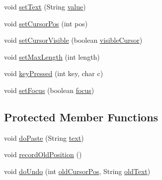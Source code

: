 \begin{DoxyCompactItemize}
\item 
void \mbox{\hyperlink{classorg_1_1newdawn_1_1slick_1_1gui_1_1_text_field_a5c926f3fc3503b4e197ebca868b101c0}{set\+Text}} (String \mbox{\hyperlink{classorg_1_1newdawn_1_1slick_1_1gui_1_1_text_field_a23c571aa0aa30ccbc28a090a06a444b7}{value}})
\item 
void \mbox{\hyperlink{classorg_1_1newdawn_1_1slick_1_1gui_1_1_text_field_a786d3eeca6b5574c561bab7492812010}{set\+Cursor\+Pos}} (int pos)
\item 
void \mbox{\hyperlink{classorg_1_1newdawn_1_1slick_1_1gui_1_1_text_field_a4eb4665c2c85367c2ab3fbe4c5be62b8}{set\+Cursor\+Visible}} (boolean \mbox{\hyperlink{classorg_1_1newdawn_1_1slick_1_1gui_1_1_text_field_af9a8a737887d06968db25185b999f5d0}{visible\+Cursor}})
\item 
void \mbox{\hyperlink{classorg_1_1newdawn_1_1slick_1_1gui_1_1_text_field_abd9e02715d6b12fbac7c79adc6fe70dc}{set\+Max\+Length}} (int length)
\item 
void \mbox{\hyperlink{classorg_1_1newdawn_1_1slick_1_1gui_1_1_text_field_abe8804392248db859a452f8bbf0955a1}{key\+Pressed}} (int key, char c)
\item 
void \mbox{\hyperlink{classorg_1_1newdawn_1_1slick_1_1gui_1_1_text_field_afc1eb9faa443f02ad96712a334989ad2}{set\+Focus}} (boolean \mbox{\hyperlink{classorg_1_1newdawn_1_1slick_1_1gui_1_1_abstract_component_a9a7b67f481728081895d167e792aaa74}{focus}})
\end{DoxyCompactItemize}
\subsection*{Protected Member Functions}
\begin{DoxyCompactItemize}
\item 
void \mbox{\hyperlink{classorg_1_1newdawn_1_1slick_1_1gui_1_1_text_field_a372f3a93f21b6b105617951d35307aa9}{do\+Paste}} (String \mbox{\hyperlink{classorg_1_1newdawn_1_1slick_1_1gui_1_1_text_field_af66b269abe9cd0edb7ecb3f492031565}{text}})
\item 
void \mbox{\hyperlink{classorg_1_1newdawn_1_1slick_1_1gui_1_1_text_field_aa8a43b0208ade72337c6d7ed34f07d04}{record\+Old\+Position}} ()
\item 
void \mbox{\hyperlink{classorg_1_1newdawn_1_1slick_1_1gui_1_1_text_field_acbfbdd0bcfc2ac4e5a1af3acaab5d801}{do\+Undo}} (int \mbox{\hyperlink{classorg_1_1newdawn_1_1slick_1_1gui_1_1_text_field_aeb272b81f1df084f3c001e91aac5ca37}{old\+Cursor\+Pos}}, String \mbox{\hyperlink{classorg_1_1newdawn_1_1slick_1_1gui_1_1_text_field_a9f52b9f250dde2673cc5063348508375}{old\+Text}})
\end{DoxyCompactItemize}
